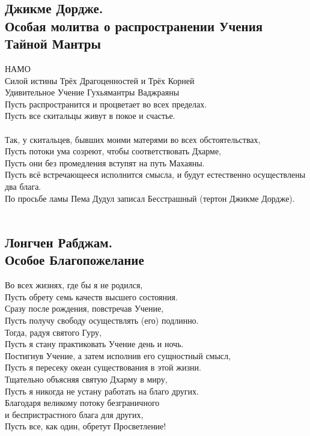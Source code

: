 \subsection{Джикме Дордже.\\Особая молитва о распространении Учения Тайной Мантры}

НАМО\\
Силой истины Трёх Драгоценностей и Трёх Корней\\
Удивительное Учение Гухьямантры Ваджраяны\\
Пусть распространится и процветает во всех пределах.\\
Пусть все скитальцы живут в покое и счастье.\\
\\
Так, у скитальцев, бывших моими матерями во всех обстоятельствах,\\
Пусть потоки ума созреют, чтобы соответствовать Дхарме,\\
Пусть они без промедления вступят на путь Махаяны.\\
Пусть всё встречающееся исполнится смысла, и будут естественно осуществлены два блага.\\
\scriptsize
По просьбе ламы Пема Дудул записал Бесстрашный (тертон Джикме Дордже).\\
\normalsize
\\

\subsection{Лонгчен Рабджам.\\Особое Благопожелание}

Во всех жизнях, где бы я не родился,\\
Пусть обрету семь качеств высшего состояния.\\
Сразу после рождения, повстречав Учение,\\
Пусть получу свободу осуществлять (его) подлинно.\\
Тогда, радуя святого Гуру,\\
Пусть я стану практиковать Учение день и ночь.\\
Постигнув Учение, а затем исполнив его сущностный смысл,\\
Пусть я пересеку океан существования в этой жизни.\\
Тщательно объясняя святую Дхарму в миру,\\
Пусть я никогда не устану работать на благо других.\\
Благодаря великому потоку безграничного\\
и беспристрастного блага для других,\\
Пусть все, как один, обретут Просветление!

